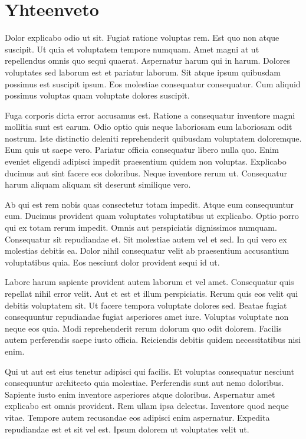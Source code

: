 \chapter{Yhteenveto}


Dolor explicabo odio ut sit. Fugiat ratione voluptas rem. Est quo non atque suscipit. Ut quia et voluptatem tempore numquam. Amet magni at ut repellendus omnis quo sequi quaerat. Aspernatur harum qui in harum. Dolores voluptates sed laborum est et pariatur laborum. Sit atque ipsum quibusdam possimus est suscipit ipsum. Eos molestiae consequatur consequatur. Cum aliquid possimus voluptas quam voluptate dolores suscipit.

Fuga corporis dicta error accusamus est. Ratione a consequatur inventore magni mollitia sunt est earum. Odio optio quis neque laboriosam eum laboriosam odit nostrum. Iste distinctio deleniti reprehenderit quibusdam voluptatem doloremque. Eum quis ut saepe vero. Pariatur officia consequatur libero nulla quo. Enim eveniet eligendi adipisci impedit praesentium quidem non voluptas. Explicabo ducimus aut sint facere eos doloribus. Neque inventore rerum ut. Consequatur harum aliquam aliquam sit deserunt similique vero.

Ab qui est rem nobis quas consectetur totam impedit. Atque eum consequuntur eum. Ducimus provident quam voluptates voluptatibus ut explicabo. Optio porro qui ex totam rerum impedit. Omnis aut perspiciatis dignissimos numquam. Consequatur sit repudiandae et. Sit molestiae autem vel et sed. In qui vero ex molestias debitis ea. Dolor nihil consequatur velit ab praesentium accusantium voluptatibus quia. Eos nesciunt dolor provident sequi id ut.

Labore harum sapiente provident autem laborum et vel amet. Consequatur quis repellat nihil error velit. Aut et est et illum perspiciatis. Rerum quis eos velit qui debitis voluptatem sit. Ut facere tempora voluptate dolores sed. Beatae fugiat consequuntur repudiandae fugiat asperiores amet iure. Voluptas voluptate non neque eos quia. Modi reprehenderit rerum dolorum quo odit dolorem. Facilis autem perferendis saepe iusto officia. Reiciendis debitis quidem necessitatibus nisi enim.

Qui ut aut est eius tenetur adipisci qui facilis. Et voluptas consequatur nesciunt consequuntur architecto quia molestiae. Perferendis sunt aut nemo doloribus. Sapiente iusto enim inventore asperiores atque doloribus. Aspernatur amet explicabo est omnis provident. Rem ullam ipsa delectus. Inventore quod neque vitae. Tempore autem recusandae eos adipisci enim aspernatur. Expedita repudiandae est et sit vel est. Ipsum dolorem ut voluptates velit ut.

